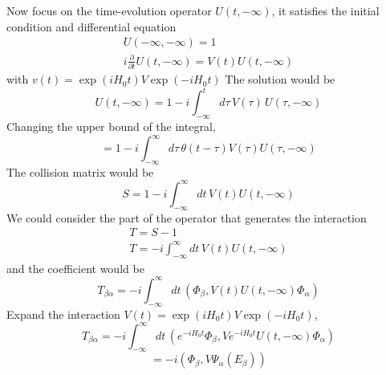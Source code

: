 \documentclass[12pt]{article}
\numberwithin{equation}{subsection}
\begin{document}
Now focus on the time-evolution operator $U(t, -\infty)$, it satisfies the initial condition and differential equation
\begin{equation}
    \begin{split}
        U(-\infty, -\infty) = 1\\
        i\frac{\partial}{\partial t}U(t, -\infty) =V(t)U(t, -\infty)
    \end{split}
\end{equation}
with $v(t) = \exp(iH_0t)V\exp(-iH_0t)$
The solution would be
\begin{equation}
    U(t, -\infty) = 1 - i\int_{-\infty}^{t}{d\tau\, V(\tau)\,U(\tau, -\infty)}
\end{equation}
Changing the upper bound of the integral,
\[ = 1 - i\int_{-\infty}^{\infty}{d\tau\,\theta(t-\tau)V(\tau)U(\tau,-\infty)}\]
The collision matrix would be
\begin{equation}
    S = 1 - i\int_{-\infty}^{\infty}{dt\,V(t)U(t,-\infty)}
\end{equation}
We could consider the part of the operator that generates the interaction
\begin{equation}
    \begin{split}
        T = S - 1\\
        T = -i\int_{-\infty}^{\infty}{dt\,V(t)U(t,-\infty)}
    \end{split}
\end{equation}
and the coefficient would be
\begin{equation}
    T_{\beta\alpha} = -i\int_{-\infty}^{\infty}{dt\,\left(\Phi_{\beta},V(t)U(t,-\infty)\Phi_{\alpha}\right)}
\end{equation}
Expand the interaction $V(t) = \exp(iH_0t)V\exp(-iH_0t)$,
\[T_{\beta\alpha} = -i\int_{-\infty}^{\infty}{dt\,\left(e^{-iH_0t}\Phi_{\beta},Ve^{-iH_0t}U(t, -\infty)\Phi_{\alpha}\right)}\]
\begin{equation} = -i\left(\Phi_{\beta}, V\Psi_{\alpha}(E_{\beta})\right)\end{equation}
\end{document}

